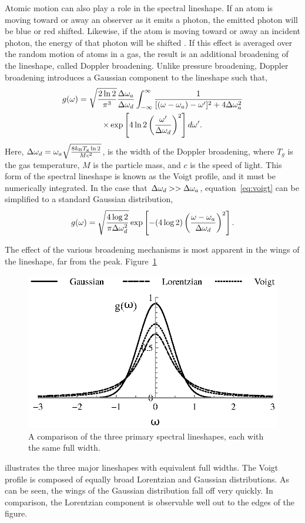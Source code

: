 Atomic motion can also play a role in the spectral lineshape. If an atom is
moving toward or away an observer as it emits a photon, the emitted photon will
be blue or red shifted. Likewise, if the atom is moving toward or away an
incident photon, the energy of that photon will be shifted \cite{Siegman1986}.
If this effect is averaged over the random motion of atoms in a gas, the result
is an additional broadening of the lineshape, called Doppler broadening. Unlike
pressure broadening, Doppler broadening introduces a Gaussian component to the
lineshape such that,
\begin{multline}
  g(\omega) = \sqrt{\frac{2\ln{2}}{\pi^3}}\frac{\Delta \omega_a}{\Delta \omega_d}
  \int_{-\infty}^\infty
  \frac{1}{[(\omega - \omega_a) - \omega']^2 + 4\Delta \omega_a^2} \\
  \times \exp\left[4\ln{2}\left(\frac{\omega'}{\Delta \omega_d}\right)^2\right]d\omega'.
  \label{eq:voigt}
\end{multline}
Here, $\Delta \omega_d = \omega_a\sqrt{\frac{8k_\mathrm{B}T_\mathrm{g}\ln{2}} {Mc^2}}$, is
the width of the Doppler broadening, where $T_g$ is the gas temperature, $M$ is
the particle mass, and $c$ is the speed of light. This form of the spectral
lineshape is known as the Voigt profile, and it must be numerically integrated.
In the case that $\Delta \omega_d >> \Delta \omega_a$, equation~\ref{eq:voigt} can be simplified to a
standard Gaussian distribution,
\begin{equation}
  g(\omega) = \sqrt{\frac{4\log{2}}{\pi\Delta \omega_d^2}}
  \exp\left[-(4\log{2})\left(\frac{\omega-\omega_a}{\Delta \omega_d}\right)^2\right].
\end{equation}

The effect of the various broadening mechanisms is most apparent in the wings of
the lineshape, far from the peak. Figure~\ref{fig:lineshapes}
\begin{figure}
  \centering
  \includegraphics{./chapters/theory/figures/lineshapes.eps}
  \caption{A comparison of the three primary spectral lineshapes, each with the
  same full width.}
  \label{fig:lineshapes}
\end{figure}
illustrates the three major lineshapes with equivalent full widths. The Voigt
profile is composed of equally broad Lorentzian and Gaussian distributions. As
can be seen, the wings of the Gaussian distribution fall off very quickly. In
comparison, the Lorentzian component is observable well out to the edges of the
figure. 

